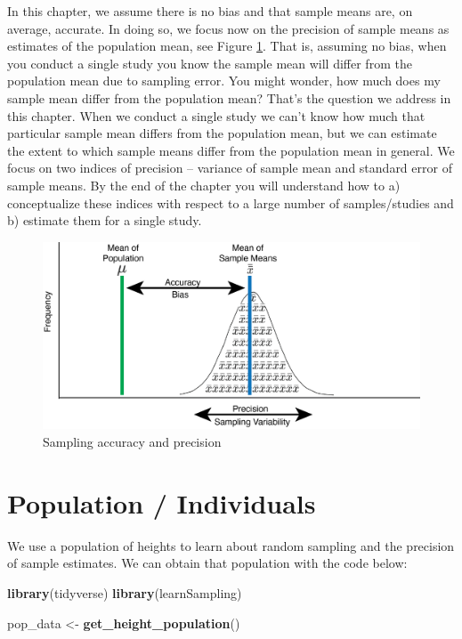 \documentclass[
]{krantz}
\makeatletter
\newenvironment{Shaded}{\begin{snugshade}}{\end{snugshade}}
\newcommand{\KeywordTok}[1]{\textcolor[rgb]{0.27,0.27,0.27}{\textbf{#1}}}
\newcommand{\NormalTok}[1]{#1}
\newcommand{\StringTok}[1]{\textcolor[rgb]{0.5,0.5,0.5}{#1}}
\newenvironment{kframe}{%
\medskip{}
\setlength{\fboxsep}{.8em}
 \def\at@end@of@kframe{}%
 \ifinner\ifhmode%
  \def\at@end@of@kframe{\end{minipage}}%
  \begin{minipage}{\columnwidth}%
 \fi\fi%
 \def\FrameCommand##1{\hskip\@totalleftmargin \hskip-\fboxsep
 \colorbox{shadecolor}{##1}\hskip-\fboxsep
     \hskip-\linewidth \hskip-\@totalleftmargin \hskip\columnwidth}%
 \MakeFramed {\advance\hsize-\width
   \@totalleftmargin\z@ \linewidth\hsize
   \@setminipage}}%
 {\par\unskip\endMakeFramed%
 \at@end@of@kframe}
\renewenvironment{Shaded}{\begin{kframe}}{\end{kframe}}
\makeatother
\begin{document}
In this chapter, we assume there is no bias and that sample means are, on average, accurate. In doing so, we focus now on the precision of sample means as estimates of the population mean, see Figure \ref{fig:showbias2}. That is, assuming no bias, when you conduct a single study you know the sample mean will differ from the population mean due to sampling error. You might wonder, how much does my sample mean differ from the population mean? That's the question we address in this chapter. When we conduct a single study we can't know how much that particular sample mean differs from the population mean, but we can estimate the extent to which sample means differ from the population mean in general. We focus on two indices of precision -- variance of sample mean and standard error of sample means. By the end of the chapter you will understand how to a) conceptualize these indices with respect to a large number of samples/studies and b) estimate them for a single study.

\begin{figure}
\includegraphics[width=0.8\linewidth]{ch_samples_precision/images/sampling_accuracy} \caption{Sampling accuracy and precision}\label{fig:showbias2}
\end{figure}

\hypertarget{population-individuals}{%
\section{Population / Individuals}\label{population-individuals}}

We use a population of heights to learn about random sampling and the precision of sample estimates. We can obtain that population with the code below:

\begin{Shaded}
\begin{Highlighting}[]
\KeywordTok{library}\NormalTok{(tidyverse)}
\KeywordTok{library}\NormalTok{(learnSampling)}

\NormalTok{pop_data <-}\StringTok{ }\KeywordTok{get_height_population}\NormalTok{() }
\end{Highlighting}
\end{Shaded}
\end{document}
